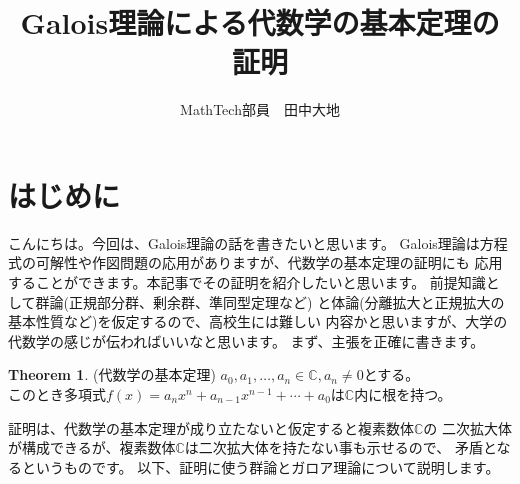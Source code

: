 \documentclass[dvipdfmx]{jsarticle}
\title{Galois理論による代数学の基本定理の証明}
\author{MathTech部員　田中大地}
\date{}
\theoremstyle{definition}
\newtheorem{theorem}[definition]{Theorem}
\begin{document}
\maketitle
\section{はじめに}
こんにちは。今回は、Galois理論の話を書きたいと思います。
Galois理論は方程式の可解性や作図問題の応用がありますが、代数学の基本定理の証明にも
応用することができます。本記事でその証明を紹介したいと思います。
前提知識として群論(正規部分群、剰余群、準同型定理など)
と体論(分離拡大と正規拡大の基本性質など)を仮定するので、高校生には難しい
内容かと思いますが、大学の代数学の感じが伝わればいいなと思います。
まず、主張を正確に書きます。
\begin{theorem}\label{algethm}(代数学の基本定理)
 $ a_0,a_1,\ldots ,a_n \in \mathbb{C},a_n\ne 0$とする。\\
 このとき多項式$f(x)=a_nx^n+a_{n-1}x^{n-1}+\cdots +a_0 $は$\mathbb{C}$内に根を持つ。
\end{theorem}
証明は、代数学の基本定理が成り立たないと仮定すると複素数体$\mathbb{C}$の
二次拡大体が構成できるが、複素数体$\mathbb{C}$は二次拡大体を持たない事も示せるので、
矛盾となるというものです。
以下、証明に使う群論とガロア理論について説明します。
\end{document}
